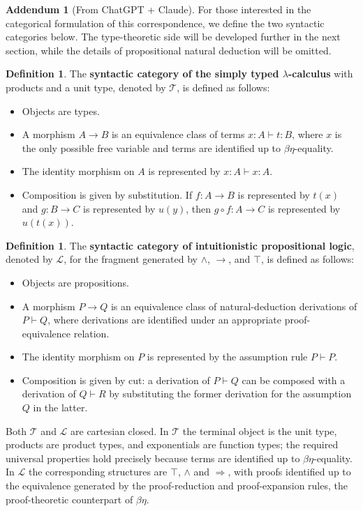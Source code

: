 \documentclass{article}
\theoremstyle{definition}
\newtheorem{definition} [theorem] {Definition}
\newtheorem{addendum}{Addendum}
\newcommand{\1}{\mathbb{1}}
\newcommand{\0}{\mathbb{0}}
\begin{document}
\begin{addendum}[From ChatGPT + Claude]
For those interested in the categorical formulation of this correspondence, we define the two syntactic categories below. The type-theoretic side will be developed further in the next section, while the details of propositional natural deduction will be omitted.

\begin{definition}
The \textbf{syntactic category of the simply typed $\lambda$-calculus} with products and a unit type, denoted by $\mathcal{T}$, is defined as follows:
\begin{itemize}
    \item Objects are types.
    \item A morphism $A \to B$ is an equivalence class of terms $x:A \vdash t:B$, where $x$ is the only possible free variable and terms are identified up to $\beta\eta$-equality.
    \item The identity morphism on $A$ is represented by $x:A \vdash x:A$.
    \item Composition is given by substitution. If $f:A\to B$ is represented by $t(x)$ and $g:B\to C$ is represented by $u(y)$, then $g\circ f:A\to C$ is represented by $u(t(x))$.
\end{itemize}
\end{definition}

\begin{definition}
The \textbf{syntactic category of intuitionistic propositional logic}, denoted by $\mathcal{L}$, for the fragment generated by $\wedge$, $\to$, and $\top$, is defined as follows:
\begin{itemize}
    \item Objects are propositions.
    \item A morphism $P \to Q$ is an equivalence class of natural-deduction derivations of $P \vdash Q$, where derivations are identified under an appropriate proof-equivalence relation.
    \item The identity morphism on $P$ is represented by the assumption rule $P \vdash P$.
    \item Composition is given by cut: a derivation of $P \vdash Q$ can be composed with a derivation of $Q \vdash R$ by substituting the former derivation for the assumption $Q$ in the latter.
\end{itemize}
\end{definition}

Both $\mathcal{T}$ and $\mathcal{L}$ are cartesian closed. In $\mathcal{T}$ the
terminal object is the unit type, products are product types, and exponentials
are function types; the required universal properties hold precisely because
terms are identified up to $\beta\eta$-equality. In $\mathcal{L}$ the
corresponding structures are $\top$, $\wedge$ and $\Rightarrow$, with proofs
identified up to the equivalence generated by the proof-reduction and
proof-expansion rules, the proof-theoretic counterpart of $\beta\eta$.


\end{addendum}
\end{document}
